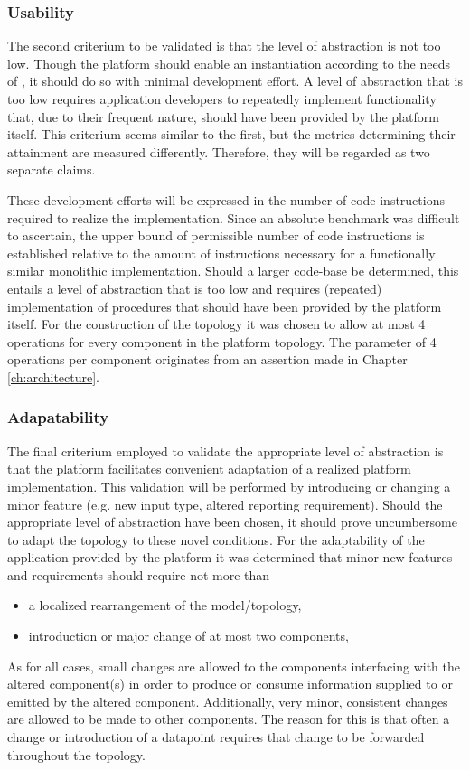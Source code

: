 \subsubsection{Usability}
The second criterium to be validated is that the level of abstraction is not too low. Though the platform should enable an instantiation according to the needs of \idsystems, it should do so with minimal development effort. A level of abstraction that is too low requires application developers to repeatedly implement functionality that, due to their frequent nature, should have been provided by the platform itself. This criterium seems similar to the first, but the metrics determining their attainment are measured differently. Therefore, they will be regarded as two separate claims.

These development efforts will be expressed in the number of code instructions required to realize the implementation. Since an absolute benchmark was difficult to ascertain, the upper bound of permissible number of code instructions is established relative to the amount of instructions necessary for a functionally similar monolithic implementation. Should a larger code-base be determined, this entails a level of abstraction that is too low and requires (repeated) implementation of procedures that should have been provided by the platform itself. For the construction of the topology it was chosen to allow at most 4 operations for every component in the platform topology. The parameter of 4 operations per component originates from an assertion made in Chapter \ref{ch:architecture}.

\subsubsection{Adapatability}
The final criterium employed to validate the appropriate level of abstraction is that the platform facilitates convenient adaptation of a realized platform implementation. This validation will be performed by introducing or changing a minor feature (e.g. new input type, altered reporting requirement). Should the appropriate level of abstraction have been chosen, it should prove uncumbersome to adapt the topology to these novel conditions. For the adaptability of the application provided by the platform it was determined that minor new features and requirements should require not more than
\begin{itemize}
\nospace
\item a localized rearrangement of the model/topology, 
\item introduction or major change of at most two components, 
\end{itemize}
As for all cases, small changes are allowed to the components interfacing with the altered component(s) in order to produce or consume information supplied to or emitted by the altered component. Additionally, very minor, consistent changes are allowed to be made to other components. The reason for this is that often a change or introduction of a datapoint requires that change to be forwarded throughout the topology.

